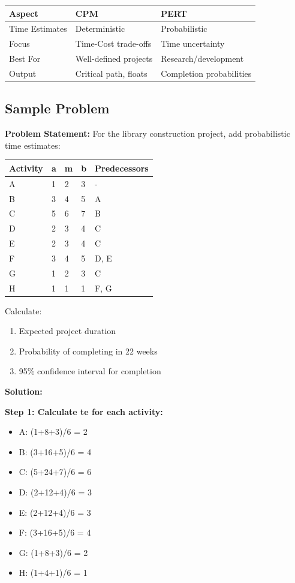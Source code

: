 \documentclass[
  letterpaper,
  DIV=11,
  numbers=noendperiod]{scrreprt}
\providecommand{\tightlist}{%
  \setlength{\itemsep}{0pt}\setlength{\parskip}{0pt}}
\begin{document}
\begin{longtable}[]{@{}lll@{}}
\toprule\noalign{}
Aspect & CPM & PERT \\
\midrule\noalign{}
\endhead
\bottomrule\noalign{}
\endlastfoot
Time Estimates & Deterministic & Probabilistic \\
Focus & Time-Cost trade-offs & Time uncertainty \\
Best For & Well-defined projects & Research/development \\
Output & Critical path, floats & Completion probabilities \\
\end{longtable}

\subsection{Sample Problem}\label{sample-problem-10}

\textbf{Problem Statement:} For the library construction project, add
probabilistic time estimates:

\begin{longtable}[]{@{}lllll@{}}
\toprule\noalign{}
Activity & a & m & b & Predecessors \\
\midrule\noalign{}
\endhead
\bottomrule\noalign{}
\endlastfoot
A & 1 & 2 & 3 & - \\
B & 3 & 4 & 5 & A \\
C & 5 & 6 & 7 & B \\
D & 2 & 3 & 4 & C \\
E & 2 & 3 & 4 & C \\
F & 3 & 4 & 5 & D, E \\
G & 1 & 2 & 3 & C \\
H & 1 & 1 & 1 & F, G \\
\end{longtable}

Calculate:

\begin{enumerate}
\def\labelenumi{\arabic{enumi}.}
\tightlist
\item
  Expected project duration
\item
  Probability of completing in 22 weeks
\item
  95\% confidence interval for completion
\end{enumerate}

\textbf{Solution:}

\textbf{Step 1: Calculate te for each activity:}

\begin{itemize}
\tightlist
\item
  A: (1+8+3)/6 = 2
\item
  B: (3+16+5)/6 = 4
\item
  C: (5+24+7)/6 = 6
\item
  D: (2+12+4)/6 = 3
\item
  E: (2+12+4)/6 = 3
\item
  F: (3+16+5)/6 = 4
\item
  G: (1+8+3)/6 = 2
\item
  H: (1+4+1)/6 = 1
\end{itemize}
\end{document}
